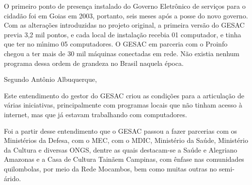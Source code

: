 \documentclass[
12pt,		%
openright,	%
twoside,  %
a4paper,			%
chapter=TITLE,		%
english,			%
french,				%
spanish,			%
brazil				%
]{USPSC-classe/USPSC}
\begin{document}
O primeiro ponto de presen\c{c}a instalado do Governo Eletr\^onico de servi\c{c}os para o cidad\~ao foi em Goias em 2003, portanto, seis meses ap\'os a posse do novo governo. Com as altera\c{c}\~oes introduzidas no projeto original, a primeira vers\~ao do GESAC previa 3,2 mil pontos, e cada local de instala\c{c}\~ao recebia 01 computador, e tinha que ter no m\'{\i}nimo 05 computadores. O GESAC em parceria com o Proinfo chegou a ter mais de 30 mil m\'aquinas conectadas em rede. N\~ao existia nenhum programa dessa ordem de grandeza no Brasil naquela \'epoca.








Segundo Ant\^onio Albuquerque,









\noindent\begin{center}\mbox{\centering{}}\end{center}


Este entendimento do gestor do GESAC criou as condi\c{c}\~oes para a articula\c{c}\~ao de v\'arias iniciativas, principalmente com programas locais que n\~ao tinham acesso \`a internet, mas que j\'a estavam trabalhando com computadores.








Foi a partir desse entendimento que o GESAC passou a fazer parcerias com os Minist\'erios da Defesa, com o MEC, com o MDIC,  Minist\'erio da Sa\'ude, Minist\'erio da Cultura e diversas ONGS, dentre as quais destacam-se a \textquotedbl Sa\'ude e Alegria\textquotedbl   no Amazonas e a \textquotedbl Casa de Cultura Tain\~a\textquotedbl  em Campinas, com \^enfase nas comunidades quilombolas, por meio da Rede Mocambos, bem como muitas outras no semi-\'arido.
\end{document}
